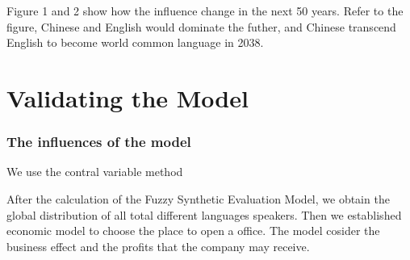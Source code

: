 \documentclass{mcmthesis}
\begin{document}
Figure 1 and 2 show how the influence change in the next 50 years. Refer to the figure, Chinese and English would dominate the futher, 
and Chinese transcend English to become world common language in 2038. 

\section{Validating the Model}
\subsubsection{The influences of the model}
\qquad We use the contral variable method



After the calculation of the Fuzzy Synthetic Evaluation Model, we obtain the global distribution of all total different languages speakers. Then we established economic model to choose the place to open a office.
The model cosider the business effect and the profits that the company may receive.
\end{document}
